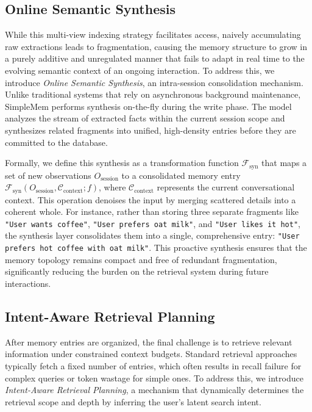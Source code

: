 \documentclass{article}
\theoremstyle{plain}
\theoremstyle{definition}
\theoremstyle{remark}
\begin{document}
\subsection{Online Semantic Synthesis}
\label{sec:consolidation}
While this multi-view indexing strategy facilitates access, naively accumulating raw extractions leads to fragmentation, causing the memory structure to grow in a purely additive and unregulated manner that fails to adapt in real time to the evolving semantic context of an ongoing interaction.
To address this, we introduce \textit{Online Semantic Synthesis}, an intra-session consolidation mechanism. Unlike traditional systems that rely on asynchronous background maintenance, SimpleMem performs synthesis on-the-fly during the write phase.
The model analyzes the stream of extracted facts within the current session scope and synthesizes related fragments into unified, high-density entries before they are committed to the database.

Formally, we define this synthesis as a transformation function $\mathcal{F}_{\text{syn}}$ that maps a set of new observations $O_{\text{session}}$ to a consolidated memory entry $\mathcal{F}_{\text{syn}}(O_{\text{session}}, \mathcal{C}_{\text{context}}; f)$, where $\mathcal{C}_{\text{context}}$ represents the current conversational context. This operation denoises the input by merging scattered details into a coherent whole. For instance, rather than storing three separate fragments like \texttt{"User wants coffee"}, \texttt{"User prefers oat milk"}, and \texttt{"User likes it hot"}, the synthesis layer consolidates them into a single, comprehensive entry: \texttt{"User prefers hot coffee with oat milk"}.
This proactive synthesis ensures that the memory topology remains compact and free of redundant fragmentation, significantly reducing the burden on the retrieval system during future interactions.

\subsection{Intent-Aware Retrieval Planning}
\label{sec:retrieval}
After memory entries are organized, the final challenge is to retrieve relevant information under constrained context budgets. Standard retrieval approaches typically fetch a fixed number of entries, which often results in recall failure for complex queries or token wastage for simple ones. To address this, we introduce \textit{Intent-Aware Retrieval Planning}, a mechanism that dynamically determines the retrieval scope and depth by inferring the user's latent search intent.
\end{document}
